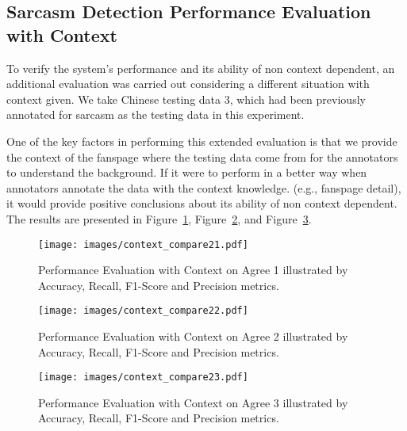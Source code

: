 \documentclass[12pt,a4paper]{report}
\theoremstyle{definition}
\begin{document}
\begin{CJK}{UTF8}{bsmi}
    \subsection{Sarcasm Detection Performance Evaluation with Context}
        \par To verify the system's performance and its ability of non context dependent, an additional evaluation was carried out considering a different situation with context given.
        We take Chinese testing data 3, which had been previously annotated for sarcasm as the testing data in this experiment.
        \par One of the key factors in performing this extended evaluation is that we provide the context of the fanspage where the testing data come from for the annotators to understand the background.
        If it were to perform in a better way when annotators annotate the data with the context knowledge. (e.g., fanspage detail), it would provide positive conclusions about its ability of non context dependent. The results are presented in Figure~\ref{fig:context_compar1}, Figure~\ref{fig:context_compar2}, and Figure~\ref{fig:context_compar3}.
        \begin{center}
        \begin{figure}[H]
            \texttt{[image: images/context\_compare21.pdf]}
            \caption{Performance Evaluation with Context on Agree 1 illustrated by Accuracy, Recall, F1-Score and Precision metrics.}
            \label{fig:context_compar1}
        \end{figure}
        \end{center}
        \begin{center}
        \begin{figure}[H]
            \texttt{[image: images/context\_compare22.pdf]}
            \caption{Performance Evaluation with Context on Agree 2 illustrated by Accuracy, Recall, F1-Score and Precision metrics.}
            \label{fig:context_compar2}
        \end{figure}
        \end{center}
        \begin{center}
        \begin{figure}[H]
            \texttt{[image: images/context\_compare23.pdf]}
            \caption{Performance Evaluation with Context on Agree 3 illustrated by Accuracy, Recall, F1-Score and Precision metrics.}
            \label{fig:context_compar3}

\end{figure}
\end{center}
\end{CJK}
\end{document}
